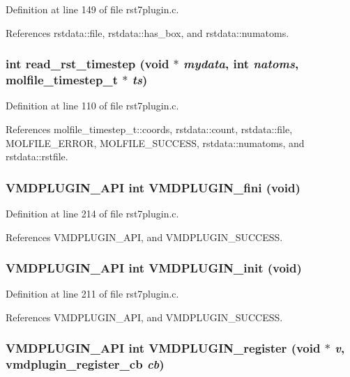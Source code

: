 Definition at line 149 of file rst7plugin.c.

References rstdata::file, rstdata::has\_\-box, and rstdata::numatoms.
\subsubsection{\setlength{\rightskip}{0pt plus 5cm}int read\_\-rst\_\-timestep (void $\ast$ {\em mydata}, int {\em natoms}, {\bf molfile\_\-timestep\_\-t} $\ast$ {\em ts})\hspace{0.3cm}{\tt  [static]}}\label{rst7plugin_8c_a2}




Definition at line 110 of file rst7plugin.c.

References molfile\_\-timestep\_\-t::coords, rstdata::count, rstdata::file, MOLFILE\_\-ERROR, MOLFILE\_\-SUCCESS, rstdata::numatoms, and rstdata::rstfile.
\subsubsection{\setlength{\rightskip}{0pt plus 5cm}VMDPLUGIN\_\-API int VMDPLUGIN\_\-fini (void)}\label{rst7plugin_8c_a8}




Definition at line 214 of file rst7plugin.c.

References VMDPLUGIN\_\-API, and VMDPLUGIN\_\-SUCCESS.
\subsubsection{\setlength{\rightskip}{0pt plus 5cm}VMDPLUGIN\_\-API int VMDPLUGIN\_\-init (void)}\label{rst7plugin_8c_a7}




Definition at line 211 of file rst7plugin.c.

References VMDPLUGIN\_\-API, and VMDPLUGIN\_\-SUCCESS.
\subsubsection{\setlength{\rightskip}{0pt plus 5cm}VMDPLUGIN\_\-API int VMDPLUGIN\_\-register (void $\ast$ {\em v}, {\bf vmdplugin\_\-register\_\-cb} {\em cb})}\label{rst7plugin_8c_a9}




